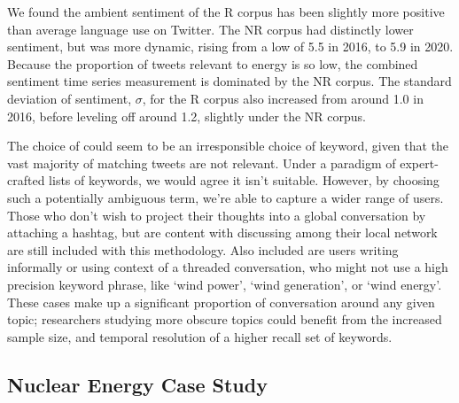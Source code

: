 We found the ambient sentiment of the R  corpus has been slightly more positive than average language use on Twitter. 
The NR corpus had distinctly lower sentiment, but was more dynamic, rising from a low of 5.5 in 2016, to 5.9 in 2020.
Because the proportion of tweets relevant to energy is so low, 
the combined sentiment time series measurement is dominated by the NR corpus. 
The standard deviation of sentiment, $\sigma$, for the R corpus also increased from around 1.0 in 2016, before leveling off around 1.2, slightly under the NR corpus.




The choice of  could seem to be an irresponsible choice of keyword, 
given that the vast majority of matching tweets are not relevant.  
Under a paradigm  of expert-crafted lists of keywords, we would agree it isn't suitable. 
However, by choosing such a potentially ambiguous term, we're able to capture a wider range of users. 
Those who don't wish to project their thoughts into a global conversation by attaching a hashtag, but are content with discussing among their local network are still included with this methodology. 
Also included are users writing informally or using context of a threaded conversation, who might not use a high precision keyword phrase, like `wind power', `wind generation', or `wind energy'.
These cases make up a significant proportion of conversation around any given topic; researchers studying more obscure topics could benefit from the increased sample size, and temporal resolution of a higher recall set of keywords.

\subsection{ Nuclear Energy Case Study}

